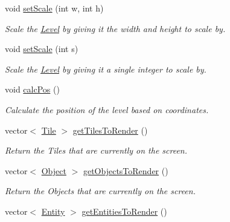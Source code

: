 \begin{DoxyCompactItemize}
void \hyperlink{classLevel_a3fcaa774a00e39090336b5a61d88e3e2}{set\+Scale} (int w, int h)
\begin{DoxyCompactList}\small\item\em Scale the \hyperlink{classLevel}{Level} by giving it the width and height to scale by. \end{DoxyCompactList}\item 
\mbox{\label{classLevel_af6fe8bc2dd6623fcbaa739403a239d77}} 
void \hyperlink{classLevel_af6fe8bc2dd6623fcbaa739403a239d77}{set\+Scale} (int s)
\begin{DoxyCompactList}\small\item\em Scale the \hyperlink{classLevel}{Level} by giving it a single integer to scale by. \end{DoxyCompactList}\item 
\mbox{\label{classLevel_a02e915f95e181dcfe95553e923a73a39}} 
void \hyperlink{classLevel_a02e915f95e181dcfe95553e923a73a39}{calc\+Pos} ()
\begin{DoxyCompactList}\small\item\em Calculate the position of the level based on coordinates. \end{DoxyCompactList}\item 
\mbox{\label{classLevel_ade9e45f70f2f3f81c120bb161f87218f}} 
vector$<$ \hyperlink{classTile}{Tile} $>$ \hyperlink{classLevel_ade9e45f70f2f3f81c120bb161f87218f}{get\+Tiles\+To\+Render} ()
\begin{DoxyCompactList}\small\item\em Return the Tiles that are currently on the screen. \end{DoxyCompactList}\item 
\mbox{\label{classLevel_a80d185e702151c5b5764c1cadcd9064d}} 
vector$<$ \hyperlink{classObject}{Object} $>$ \hyperlink{classLevel_a80d185e702151c5b5764c1cadcd9064d}{get\+Objects\+To\+Render} ()
\begin{DoxyCompactList}\small\item\em Return the Objects that are currently on the screen. \end{DoxyCompactList}\item 
\mbox{\label{classLevel_a1a95e314e19e1fdba6850e9aa8da856e}} 
vector$<$ \hyperlink{classEntity}{Entity} $>$ \hyperlink{classLevel_a1a95e314e19e1fdba6850e9aa8da856e}{get\+Entities\+To\+Render} ()

\end{DoxyCompactItemize}
